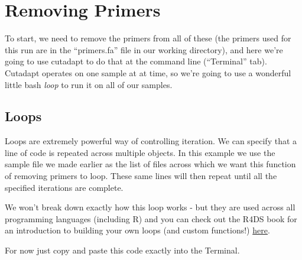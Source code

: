 \documentclass[
]{book}
\newenvironment{Shaded}{\begin{snugshade}}{\end{snugshade}}
\newcommand{\AttributeTok}[1]{\textcolor[rgb]{0.77,0.63,0.00}{#1}}
\newcommand{\BuiltInTok}[1]{#1}
\newcommand{\ControlFlowTok}[1]{\textcolor[rgb]{0.13,0.29,0.53}{\textbf{#1}}}
\newcommand{\DataTypeTok}[1]{\textcolor[rgb]{0.13,0.29,0.53}{#1}}
\newcommand{\DecValTok}[1]{\textcolor[rgb]{0.00,0.00,0.81}{#1}}
\newcommand{\ExtensionTok}[1]{#1}
\newcommand{\FunctionTok}[1]{\textcolor[rgb]{0.00,0.00,0.00}{#1}}
\newcommand{\KeywordTok}[1]{\textcolor[rgb]{0.13,0.29,0.53}{\textbf{#1}}}
\newcommand{\NormalTok}[1]{#1}
\newcommand{\OperatorTok}[1]{\textcolor[rgb]{0.81,0.36,0.00}{\textbf{#1}}}
\newcommand{\StringTok}[1]{\textcolor[rgb]{0.31,0.60,0.02}{#1}}
\newcommand{\VariableTok}[1]{\textcolor[rgb]{0.00,0.00,0.00}{#1}}
\begin{document}
\hypertarget{removing-primers}{%
\section{Removing Primers}\label{removing-primers}}

To start, we need to remove the primers from all of these (the primers used for this run are in the ``primers.fa'' file in our working directory), and here we're going to use cutadapt to do that at the command line (``Terminal'' tab). Cutadapt operates on one sample at at time, so we're going to use a wonderful little bash \emph{loop} to run it on all of our samples.

\hypertarget{loops}{%
\subsection{Loops}\label{loops}}

Loops are extremely powerful way of controlling iteration. We can specify that a line of code is repeated across multiple objects. In this example we use the sample file we made earlier as the list of files across which we want this function of removing primers to loop. These same lines will then repeat until all the specified iterations are complete.

We won't break down exactly how this loop works - but they are used across all programming languages (including R) and you can check out the R4DS book for an introduction to building your own loops (and custom functions!) \href{https://r4ds.had.co.nz/iteration.html}{here}.

For now just copy and paste this code exactly into the Terminal.

\begin{Shaded}
\end{Shaded}
\end{document}
